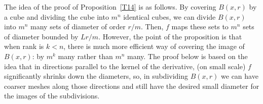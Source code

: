 \documentclass[12pt,leqno]{amsart}
\theoremstyle{definition}
\newtheorem{remark}[theorem]{Remark}
\numberwithin{theorem}{section} \numberwithin{equation}{section}
\begin{document}
The idea of the proof of Proposition~\ref{T14} is as follows.
By covering $B(x,r)$ by a cube and dividing the cube into $m^n$ identical cubes,
we can divide $B(x,r)$ into $m^n$ many sets of diameter of order $r/m$. Then, $f$ maps these sets to $m^n$ sets of diameter bounded by $Lr/m$. However, the point of the proposition is that when rank is $k<n$, there is much more efficient way of covering the image of $B(x,r)$: by $m^k$ many rather than $m^n$ many. The proof below is based on the idea that in directions parallel to the kernel of the derivative, (on small scale) $f$ significantly shrinks down the diameters, so, in subdividing $B(x,r)$ we can have coarser meshes along those directions and still have the desired small diameter for the images of the subdivisions.
\end{document}
